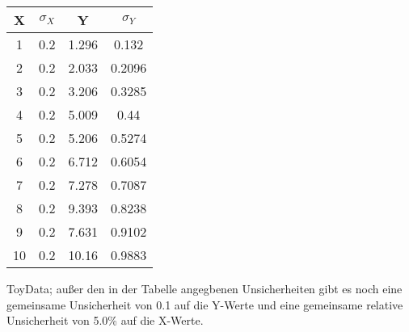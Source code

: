 \begin{tabular}{cccc}
\hline
X & $\sigma_X$ & Y & $\sigma_Y$\\
\hline
1 & 0.2 & 1.296 & 0.132\\
2 & 0.2 & 2.033 & 0.2096\\
3 & 0.2 & 3.206 & 0.3285\\
4 & 0.2 & 5.009 & 0.44\\
5 & 0.2 & 5.206 & 0.5274\\
6 & 0.2 & 6.712 & 0.6054\\
7 & 0.2 & 7.278 & 0.7087\\
8 & 0.2 & 9.393 & 0.8238\\
9 & 0.2 & 7.631 & 0.9102\\
10 & 0.2 & 10.16 & 0.9883\\

\hline
\end{tabular}
\caption{ToyData; außer den in der Tabelle angegbenen Unsicherheiten gibt es noch eine gemeinsame Unsicherheit von 0.1 auf die Y-Werte und eine gemeinsame relative Unsicherheit von 5.0\% auf die X-Werte.}
